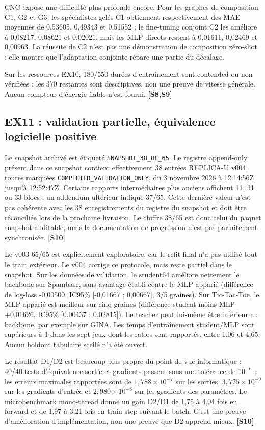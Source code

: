 \documentclass[11pt,a4paper]{article}
\newcommand{\src}[1]{\textbf{[#1]}}
\newcommand{\code}[1]{\texttt{\small #1}}
\begin{document}
CNC expose une difficulté plus profonde encore. Pour les graphes de composition G1, G2 et G3, les spécialistes gelés C1 obtiennent respectivement des MAE moyennes de 0,53605, 0,49343 et 0,51552 ; le fine-tuning conjoint C2 les améliore à 0,08217, 0,08621 et 0,02021, mais les MLP directs restent à 0,01611, 0,02469 et 0,00963. La réussite de C2 n'est pas une démonstration de composition zéro-shot : elle montre que l'adaptation conjointe répare une partie du décalage.

Sur les ressources EX10, 180/550 durées d'entraînement sont contended ou non vérifiées ; les 370 restantes sont descriptives, non une preuve de vitesse générale. Aucun compteur d'énergie fiable n'est fourni. \src{S8,S9}

\subsection{EX11 : validation partielle, équivalence logicielle positive}

Le snapshot archivé est étiqueté \code{SNAPSHOT\_38\_OF\_65}. Le registre append-only présent dans ce snapshot contient effectivement 38 entrées REPLICA-U v004, toutes marquées \code{COMPLETED\_VALIDATION\_ONLY}, du 3 novembre 2026 à 12:14:56Z jusqu'à 12:52:47Z. Certains rapports intermédiaires plus anciens affichent 11, 31 ou 33 blocs ; un addendum ultérieur indique 37/65. Cette dernière valeur n'est pas cohérente avec les 38 enregistrements du registre du snapshot et doit être réconciliée lors de la prochaine livraison. Le chiffre 38/65 est donc celui du paquet snapshot auditable, mais la documentation de progression n'est pas parfaitement synchronisée. \src{S10}

Le v003 65/65 est explicitement exploratoire, car le refit final n'a pas utilisé tout le train extérieur. Le v004 corrige ce protocole, mais reste partiel dans le snapshot. Sur les données de validation, le student64 améliore nettement le backbone sur Spambase, sans avantage établi contre le MLP apparié (différence de log-loss -0,00500, IC95\% [-0,01667 ; 0,00667], 3/5 graines). Sur Tic-Tac-Toe, le MLP apparié est meilleur sur cinq graines (différence student moins MLP +0,01626, IC95\% [0,00437 ; 0,02815]). Le teacher peut lui-même être inférieur au backbone, par exemple sur GINA. Les temps d'entraînement student/MLP sont supérieurs à 1 dans les sept jeux dont les ratios sont rapportés, entre 1,06 et 4,65. Aucun holdout tabulaire scellé n'a été ouvert.

Le résultat D1/D2 est beaucoup plus propre du point de vue informatique : 40/40 tests d'équivalence sortie et gradients passent sous une tolérance de $10^{-6}$ ; les erreurs maximales rapportées sont de $1,788\times10^{-7}$ sur les sorties, $3,725\times10^{-9}$ sur les gradients d'entrée et $2,980\times10^{-8}$ sur les gradients des paramètres. Le microbenchmark mono-thread donne un gain D2/D1 de 1,75 à 4,04 fois en forward et de 1,97 à 3,21 fois en train-step suivant le batch. C'est une preuve d'amélioration d'implémentation, non une preuve que D2 apprend mieux. \src{S10}
\end{document}
